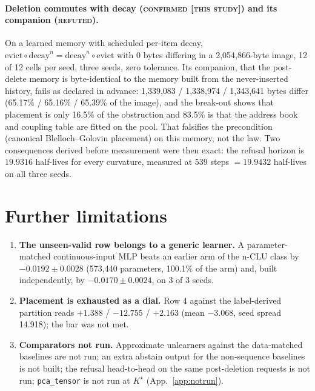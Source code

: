 \documentclass{article} %
\newcommand{\Kstar}{\ensuremath{K^{\star}}}
\begin{document}
\paragraph{Deletion commutes with decay (\textsc{confirmed [this study]}) and its companion
(\textsc{refuted}).} On a learned memory with scheduled per-item decay,
$\text{evict}\circ\text{decay}^n=\text{decay}^n\circ\text{evict}$ with 0 bytes differing in a
2,054,866-byte image, 12 of 12 cells per seed, three seeds, zero tolerance.
Its companion, that the post-delete memory is byte-identical to the memory built from the
never-inserted history, fails as declared in advance: 1,339,083 / 1,338,974 / 1,343,641 bytes differ
(65.17\% / 65.16\% / 65.39\% of the image), and the break-out shows that placement is only 16.5\%
of the obstruction and 83.5\% is that the address book and coupling table are fitted on the pool.
That falsifies the precondition (canonical Blelloch--Golovin placement) on this memory, not the
law. Two consequences derived before measurement were then exact: the refusal horizon is $19.9316$
half-lives for every curvature, measured at 539 steps $=19.9432$ half-lives on all three seeds.


\section{Further limitations}
\label{app:morelimits}
\begin{enumerate}
\item \textbf{The unseen-valid row belongs to a generic learner.} A parameter-matched
  continuous-input MLP beats an earlier arm of the n-CLU class by $-0.0192\pm0.0028$ (573,440
  parameters, 100.1\% of the arm) and, built independently, by $-0.0170\pm0.0024$, on 3 of 3
  seeds. %
\item \textbf{Placement is exhausted as a dial.} Row 4 against the label-derived partition reads
  $+1.388$ / $-12.755$ / $+2.163$ (mean $-3.068$, seed spread 14.918); the bar was not met.
\item \textbf{Comparators not run.} Approximate unlearners against the data-matched baselines are not
  run; an extra abstain output for the non-sequence baselines is not built; the refusal head-to-head on
  the same post-deletion requests is not run; \texttt{pca\_tensor} is not run at $\Kstar$
  (App.~\ref{app:notrun}).
\end{enumerate}
\end{document}
